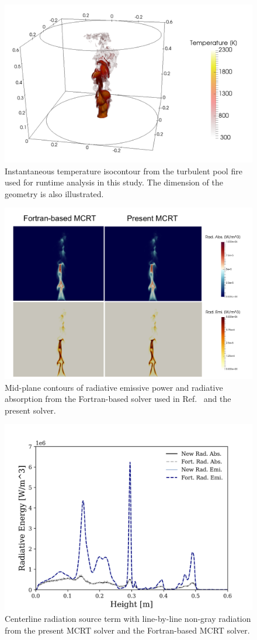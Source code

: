 \begin{figure}[!b]
\centering
\includegraphics[width=0.8\linewidth]{figures/ch4/PoolFireVisual.png}
\caption{Instantaneous temperature isocontour from the turbulent pool fire used for runtime analysis in this study. The dimension of the geometry is also illustrated.}
\label{fig:PoolFireVisual}
\end{figure}


\begin{figure}[!b]
\centering

\includegraphics[width=0.7\linewidth]{figures/ch4/PoolFire_Verification.png}
\caption{Mid-plane contours of radiative emissive power and radiative absorption from the Fortran-based solver used in Ref.~\cite{Wu2020DetailedFire} and the present solver.}
\label{fig:PoolFireVerificationColor}
\end{figure}


\begin{figure}[!bh]
\centering

\includegraphics[width=0.7\linewidth]{figures/ch4/lineplot_verification.png}
\caption{Centerline radiation source term with line-by-line non-gray radiation from the present MCRT solver and the Fortran-based MCRT solver.}
\label{fig:PoolFireVerificationLine}
\end{figure}

